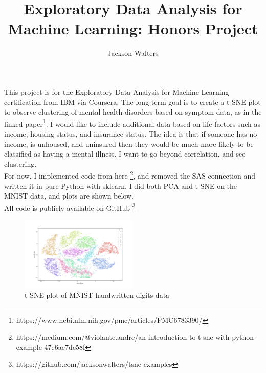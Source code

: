 \documentclass[11pt]{amsart}
\title{Exploratory Data Analysis for Machine Learning: Honors Project}
\author{Jackson Walters}
\date{}                                           %
\begin{document}
\maketitle

This project is for the Exploratory Data Analysis for Machine Learning certification from IBM via Coursera. The long-term goal is to create a t-SNE plot to observe clustering of mental health disorders based on symptom data, as in the linked paper\footnote{https://www.ncbi.nlm.nih.gov/pmc/articles/PMC6783390/}. I would like to include additional data based on life factors such as income, housing status, and insurance status. The idea is that if someone has no income, is unhoused, and uninsured then they would be much more likely to be classified as having a mental illness. I want to go beyond correlation, and see clustering. \\

For now, I implemented code from here \footnote{https://medium.com/@violante.andre/an-introduction-to-t-sne-with-python-example-47e6ae7dc58f}, and removed the SAS connection and written it in pure Python with sklearn. I did both PCA and t-SNE on the MNIST data, and plots are shown below. \\

All code is publicly available on GitHub \footnote{https://github.com/jacksonwalters/tsne-examples}

\begin{figure}[h]
\caption{t-SNE plot of MNIST handwritten digits data}
\centering
\includegraphics[width=0.5\textwidth]{t-SNE_plot_MNIST}
\end{figure}
\end{document}
